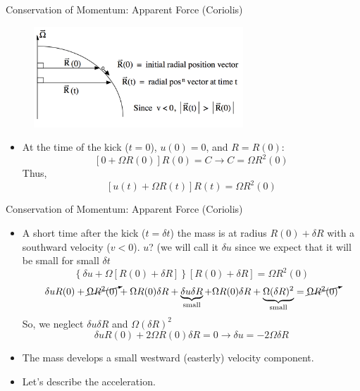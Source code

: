 \begin{frame}{Conservation of Momentum: Apparent Force (Coriolis)}
\begin{figure}
		\includegraphics[width=0.7\textwidth]{coriolis3}	
	\end{figure}
\begin{itemize}
	\item At the time of the kick ($t=0$), $u(0) = 0$, and $R = R(0)$:
	$$\left[0 + \Omega R(0)\right]R(0) = C \rightarrow C= \Omega R^2(0)$$
	Thus,
	$$\left[ u(t) + \Omega R(t)\right] R(t) = \Omega R^2(0)$$
\end{itemize}
\end{frame}
\begin{frame}{Conservation of Momentum: Apparent Force (Coriolis)}

\begin{itemize}
	\item A short time after the kick ($t=\delta t$) the mass is at radius $R(0) + \delta R$ with a southward velocity ($v<0$). $u$? (we will call it $\delta u$ since we expect that it will be small for small $\delta t$
	$$\left\{ \delta u + \Omega \left[ R(0) + \delta R\right]\right\}\left[R(0) + \delta R\right] = \Omega R^2(0)$$
	$$\delta u R(0) + \cancelto{}{\Omega R^2(0)} + \Omega R(0) \delta R + \underbrace{\delta u \delta R}_{\text{small}} + \Omega R(0) \delta R + \underbrace{\Omega(\delta R)^2}_{\text{small}} = \cancelto{}{\Omega R^2(0)}$$ 
	So, we neglect $\delta u \delta R$ and $\Omega(\delta R)^2$
	$$\delta u R(0) + 2\Omega R(0) \delta R = 0 \rightarrow \delta u = -2\Omega \delta R$$
	\item The mass develops a small westward (easterly) velocity component.
	\item Let's describe the acceleration.
\end{itemize}
\end{frame}
